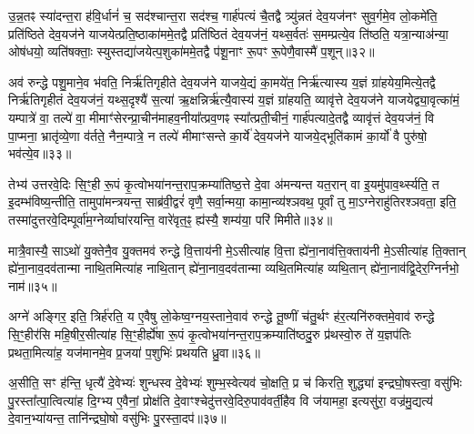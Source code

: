 उ॒न्न॒तꣴ स्या॑दन्त॒रा ह॑वि॒र्धानं॑ च॒ सद॑श्चान्त॒रा सद॑श्च॒ गार्\mbox{}ह॑पत्यं चै॒तद्वै त्र्यु॑न्नतं देव॒यज॑नꣳ सुव॒र्गमे॒व लो॒कमे॑ति॒ प्रति॑ष्ठिते देव॒यज॑ने याजयेत्प्रति॒ष्ठाका॑ममे॒तद्वै प्रति॑ष्ठितं देव॒यज॑नं॒ यथ्स॒र्वतः॑ स॒मम्प्रत्ये॒व ति॑ष्ठति॒ यत्रा॒न्याअ॑न्या॒ ओष॑धयो॒ व्यति॑षक्ताः॒ स्युस्तद्या॑जयेत्प॒शुका॑ममे॒तद्वै प॑शू॒नाꣳ रू॒पꣳ रू॒पेणै॒वास्मै॑ प॒शून्॥३२॥

अव॑ रुन्द्धे पशु॒माने॒व भ॑वति॒ निर्\mbox{}ऋ॑तिगृहीते देव॒यज॑ने याजये॒द्यं का॒मये॑त॒ निर्\mbox{}ऋ॑त्यास्य य॒ज्ञं ग्रा॑हयेय॒मित्ये॒तद्वै निर्\mbox{}ऋ॑तिगृहीतं देव॒यज॑नं॒ यथ्स॒दृश्यै॑ स॒त्या॑ ऋ॒क्षन्निर्\mbox{}ऋ॑त्यै॒वास्य॑ य॒ज्ञं ग्रा॑हयति॒ व्यावृ॑त्ते देव॒यज॑ने याजयेद्व्या॒वृत्का॑मं॒ यम्पात्रे॑ वा॒ तल्पे॑ वा॒ मीमाꣳ॑सेरन्प्रा॒चीन॑माहव॒नीया᳚त्प्रव॒णꣴ स्या᳚त्प्रती॒चीनं॒ गार्\mbox{}ह॑पत्यादे॒तद्वै व्यावृ॑त्तं देव॒यज॑नं॒ वि पा॒प्मना॒ भ्रातृ॑व्ये॒णा व॑र्तते॒ नैन॒म्पात्रे॒ न तल्पे॑ मीमाꣳसन्ते का॒र्ये॑ देव॒यज॑ने याजये॒द्भूति॑कामं का॒र्यो॑ वै पुरु॑षो॒ भव॑त्ये॒व॥३३॥

{\anuvakamend[{यात॒वै ह॑वि॒र्धान॑ञ्च प॒शून्पा॒प्मना॒\-ऽष्टाद॑श च}]}%

तेभ्य॑ उत्तरवे॒दिः सि॒ꣳ॒ही रू॒पं कृ॒त्वोभया॑नन्त॒राप॒क्रम्या॑तिष्ठ॒त्ते दे॒वा अ॑मन्यन्त यत॒रान् वा इ॒यमु॑पाव॒र्थ्स्यति॒ त इ॒दम्भ॑विष्य॒न्तीति॒ तामुपा॑मन्त्रयन्त॒ साब्र॑वी॒द्वरं॑ वृणै॒ सर्वा॒न्मया॒ कामा॒न्व्य॑श्ञवथ॒ पूर्वां तु मा॒\-ऽग्नेराहु॑तिरश्ञवता॒ इति॒ तस्मा॑दुत्तरवे॒दिम्पूर्वा॑म॒ग्नेर्व्याघा॑रयन्ति॒ वारे॑वृत॒ꣴ॒ ह्य॑स्यै॒ शम्य॑या॒ परि॑ मिमीते॥३४॥

मात्रै॒वास्यै॒ सा\-ऽथो॑ यु॒क्तेनै॒व यु॒क्तमव॑ रुन्द्धे वि॒त्ताय॑नी मे॒\-ऽसीत्या॑ह वि॒त्ता ह्ये॑ना॒नाव॑त्ति॒क्ताय॑नी मे॒\-ऽसीत्या॑ह ति॒क्तान् ह्ये॑ना॒नाव॒दव॑तान्मा नाथि॒तमित्या॑ह नाथि॒तान् ह्ये॑ना॒नाव॒दव॑तान्मा व्यथि॒तमित्या॑ह व्यथि॒तान् ह्ये॑ना॒नाव॑द्वि॒देर॒ग्निर्नभो॒ नाम॑॥३५॥

अग्ने॑ अङ्गिर॒ इति॒ त्रिर्\mbox{}ह॑रति॒ य ए॒वैषु लो॒केष्व॒ग्नय॒स्ताने॒वाव॑ रुन्द्धे तू॒ष्णीं च॑तु॒र्थꣳ ह॑र॒त्यनि॑रुक्तमे॒वाव॑ रुन्द्धे सि॒ꣳ॒हीर॑सि महि॒षीर॒सीत्या॑ह सि॒ꣳ॒हीर्\mbox{}ह्ये॑षा रू॒पं कृ॒त्वोभया॑नन्त॒राप॒क्रम्याति॑ष्ठदु॒रु प्र॑थस्वो॒रु ते॑ य॒ज्ञप॑तिः प्रथता॒मित्या॑ह॒ यज॑मानमे॒व प्र॒जया॑ प॒शुभिः॑ प्रथयति ध्रु॒वा॥३६॥

अ॒सीति॒ सꣳ ह॑न्ति॒ धृत्यै॑ दे॒वेभ्यः॑ शुन्धस्व दे॒वेभ्यः॑ शुम्भ॒स्वेत्यव॑ चो॒क्षति॒ प्र च॑ किरति॒ शुद्ध्या॑ इन्द्रघो॒षस्त्वा॒ वसु॑भिः पु॒रस्ता᳚त्पा॒त्वित्या॑ह दि॒ग्भ्य ए॒वैनां॒ प्रोक्ष॑ति दे॒वाꣳश्चेदु॑त्तरवे॒दिरु॒पाव॑वर्ती॒हैव वि ज॑यामहा॒ इत्यसु॑रा॒ वज्र॑मु॒द्यत्य॑ दे॒वान॒भ्या॑यन्त॒ तानि॑न्द्रघो॒षो वसु॑भिः पु॒रस्ता॒दप॑॥३७॥

